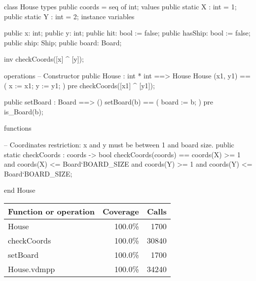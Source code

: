 \begin{vdm_al}
class House
 types
  public coords = seq of int;
 values
  public static X : int = 1;
  public static Y : int = 2;
 instance variables
 
 public x: int;
 public y: int;
 public hit: bool := false;
 public hasShip: bool := false;
 public ship: Ship;
 public board: Board;

 inv checkCoords([x] ^ [y]);
 
 operations
  -- Constructor
  public House : int * int ==> House
   House (x1, y1) ==
   (
    x := x1;
    y := y1;
   )
  pre checkCoords([x1] ^ [y1]);
  
  public setBoard : Board ==> ()
   setBoard(b) ==
   (
    board := b;
   )
  pre is_Board(b);
 
 functions
 
  -- Coordinates restriction: x and y must be between 1 and board size. 
  public static checkCoords : coords -> bool
   checkCoords(coords) ==
    coords(X) >= 1 and coords(X) <= Board`BOARD_SIZE and
    coords(Y) >= 1 and coords(Y) <= Board`BOARD_SIZE;
 
end House
\end{vdm_al}
\bigskip
\begin{longtable}{|l|r|r|}
\hline
Function or operation & Coverage & Calls \\
\hline
\hline
House & 100.0\% & 1700 \\
\hline
checkCoords & 100.0\% & 30840 \\
\hline
setBoard & 100.0\% & 1700 \\
\hline
\hline
House.vdmpp & 100.0\% & 34240 \\
\hline
\end{longtable}

